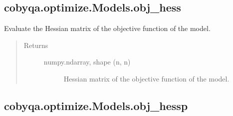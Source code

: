 \documentclass[letterpaper,10pt,english]{sphinxmanual}
\begin{document}
\begin{fulllineitems}
\begin{fulllineitems}
\begin{quote}
\begin{description}
\begin{description}
\end{description}

\end{description}\end{quote}

\end{fulllineitems}



\subsection{cobyqa.optimize.Models.obj\_hess}
\label{\detokenize{refs/generated/cobyqa.optimize.Models.obj_hess:cobyqa-optimize-models-obj-hess}}\label{\detokenize{refs/generated/cobyqa.optimize.Models.obj_hess::doc}}

\begin{fulllineitems}
\label{\detokenize{refs/generated/cobyqa.optimize.Models.obj_hess:cobyqa.optimize.Models.obj_hess}}
\sphinxAtStartPar
Evaluate the Hessian matrix of the objective function of the model.
\begin{quote}\begin{description}
\item[{Returns}] \leavevmode\begin{description}
\item[{numpy.ndarray, shape (n, n)}] \leavevmode
\sphinxAtStartPar
Hessian matrix of the objective function of the model.

\end{description}

\end{description}\end{quote}

\end{fulllineitems}



\subsection{cobyqa.optimize.Models.obj\_hessp}
\label{\detokenize{refs/generated/cobyqa.optimize.Models.obj_hessp:cobyqa-optimize-models-obj-hessp}}\label{\detokenize{refs/generated/cobyqa.optimize.Models.obj_hessp::doc}}


\end{fulllineitems}
\end{document}
